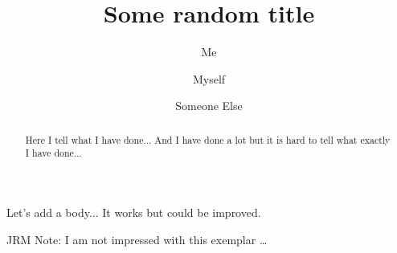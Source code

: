 \documentclass[12pt, twocolumn]{revtex4-1}    %
\begin{document}
\title{Some random title}
\author{Me}
\author{Myself}
\author{Someone Else}

\begin{abstract}
Here I tell what I have done... And I have done a lot but it is hard to tell what exactly I have done...
\end{abstract}

\maketitle

Let's add a body... It works but could be improved. 

\blindtext \cite{article-minimal}

JRM Note: I am not impressed with this exemplar \ldots

\end{document}
